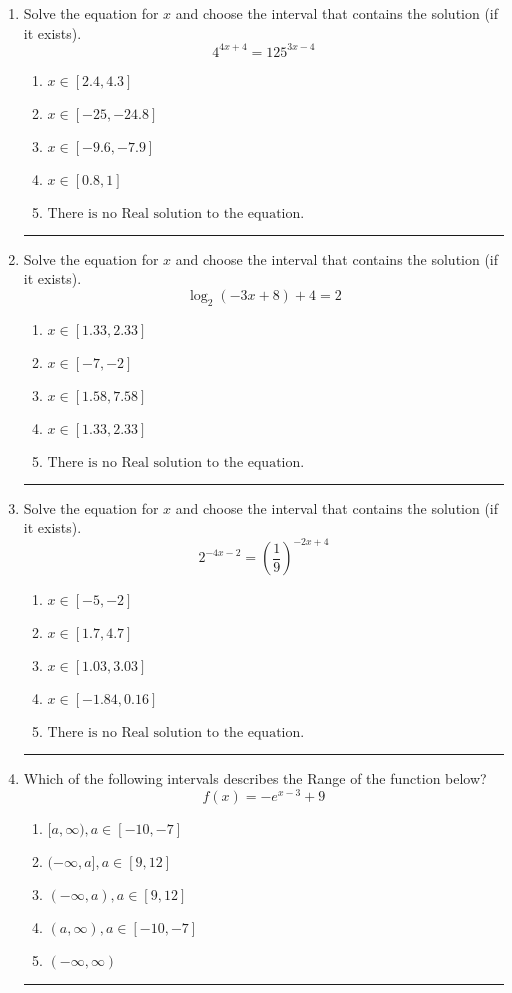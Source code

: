 \documentclass[14pt]{extbook}
\newcommand{\litem}[1]{\item#1\hspace*{-1cm}\rule{\textwidth}{0.4pt}}
\begin{document}
\begin{enumerate}
{\begin{enumerate}[label=\Alph*.]
\end{enumerate} }
\litem{
Solve the equation for $x$ and choose the interval that contains the solution (if it exists).\[ 4^{4x+4} = 125^{3x-4} \]\begin{enumerate}[label=\Alph*.]
\item \( x \in [2.4, 4.3] \)
\item \( x \in [-25, -24.8] \)
\item \( x \in [-9.6, -7.9] \)
\item \( x \in [0.8, 1] \)
\item \( \text{There is no Real solution to the equation.} \)

\end{enumerate} }
\litem{
Solve the equation for $x$ and choose the interval that contains the solution (if it exists).\[ \log_{2}{(-3x+8)}+4 = 2 \]\begin{enumerate}[label=\Alph*.]
\item \( x \in [1.33, 2.33] \)
\item \( x \in [-7, -2] \)
\item \( x \in [1.58, 7.58] \)
\item \( x \in [1.33, 2.33] \)
\item \( \text{There is no Real solution to the equation.} \)

\end{enumerate} }
\litem{
Solve the equation for $x$ and choose the interval that contains the solution (if it exists).\[ 2^{-4x-2} = \left(\frac{1}{9}\right)^{-2x+4} \]\begin{enumerate}[label=\Alph*.]
\item \( x \in [-5, -2] \)
\item \( x \in [1.7, 4.7] \)
\item \( x \in [1.03, 3.03] \)
\item \( x \in [-1.84, 0.16] \)
\item \( \text{There is no Real solution to the equation.} \)

\end{enumerate} }
\litem{
Which of the following intervals describes the Range of the function below?\[ f(x) = -e^{x-3}+9 \]\begin{enumerate}[label=\Alph*.]
\item \( [a, \infty), a \in [-10, -7] \)
\item \( (-\infty, a], a \in [9, 12] \)
\item \( (-\infty, a), a \in [9, 12] \)
\item \( (a, \infty), a \in [-10, -7] \)
\item \( (-\infty, \infty) \)


\end{enumerate}}
\end{enumerate}
\end{document}
